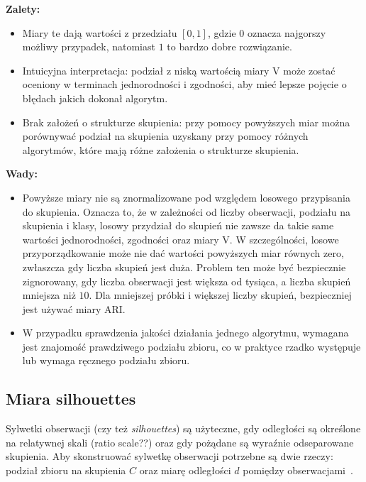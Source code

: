 \documentclass{praca1}
\begin{document}
\textbf{Zalety:}
\begin{itemize}
\item Miary te dają wartości z przedziału $[0, 1]$, gdzie $0$ oznacza najgorszy możliwy przypadek, natomiast $1$ to bardzo dobre rozwiązanie.
\item Intuicyjna interpretacja: podział z niską wartością miary V może zostać oceniony w terminach jednorodności i zgodności, aby mieć lepsze pojęcie o błędach jakich dokonał algorytm.
\item Brak założeń o strukturze skupienia: przy pomocy powyższych miar można porównywać podział na skupienia uzyskany przy pomocy różnych algorytmów, które mają różne założenia o strukturze skupienia.
\end{itemize}


\textbf{Wady:}
\begin{itemize}
\item Powyższe miary nie są znormalizowane pod względem losowego przypisania do skupienia. Oznacza to, że w zależności od liczby obserwacji, podziału na skupienia i klasy, losowy przydział do skupień nie zawsze da takie same wartości jednorodności, zgodności oraz miary V. W szczególności, losowe przyporządkowanie może nie dać wartości powyższych miar równych zero, zwłaszcza gdy liczba skupień jest duża. Problem ten może być bezpiecznie zignorowany, gdy liczba obserwacji jest większa od tysiąca, a liczba skupień mniejsza niż $10$. Dla mniejszej próbki i większej liczby skupień, bezpieczniej jest używać miary ARI.
\item W przypadku sprawdzenia jakości działania jednego algorytmu, wymagana jest znajomość prawdziwego podziału zbioru, co w praktyce rzadko występuje lub wymaga ręcznego podziału zbioru.
\end{itemize}

\subsection{Miara silhouettes}

Sylwetki obserwacji (czy też \emph{silhouettes}) są użyteczne, gdy odległości są określone na relatywnej skali (ratio scale??) oraz gdy pożądane są wyraźnie odseparowane skupienia. Aby skonstruować sylwetkę obserwacji potrzebne są dwie rzeczy: podział zbioru na skupienia $C$ oraz miarę odległości $d$ pomiędzy obserwacjami~\cite{Rousseeuw1987:silhoutte}.
\end{document}
